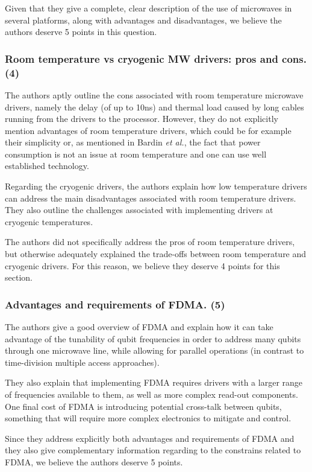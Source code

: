 \documentclass[11pt]{article}
\begin{document}
Given that they give a complete, clear description of the use of
microwaves in several platforms, along with advantages and
disadvantages, we believe the authors deserve 5 points in this
question.

\subsubsection{Room temperature vs cryogenic MW drivers: pros and cons. (4)}
\label{sec:org5e1809f}
The authors aptly outline the cons associated with room
temperature microwave drivers, namely the delay (of up to 10ns)
and thermal load caused by long cables running from the drivers to
the processor. However, they do not explicitly mention advantages
of room temperature drivers, which could be for example their
simplicity or, as mentioned in Bardin \emph{et al.}, the fact that power
consumption is not an issue at room temperature and one can use
well established technology.

Regarding the cryogenic drivers, the authors explain how low
temperature drivers can address the main disadvantages associated
with room temperature drivers. They also outline the challenges
associated with implementing drivers at cryogenic temperatures.

The authors did not specifically address the pros of room
temperature drivers, but otherwise adequately explained the
trade-offs between room temperature and cryogenic drivers. For
this reason, we believe they deserve 4 points for this section.

\subsubsection{Advantages and requirements of FDMA. (5)}
\label{sec:orgb526cf4}
The authors give a good overview of FDMA and explain how it can
take advantage of the tunability of qubit frequencies in order to
address many qubits through one microwave line, while allowing for
parallel operations (in contrast to time-division multiple access
approaches). 

They also explain that implementing FDMA requires drivers with a
larger range of frequencies available to them, as well as more
complex read-out components. One final cost of FDMA is introducing
potential cross-talk between qubits, something that will require
more complex electronics to mitigate and control.

Since they address explicitly both advantages and requirements of FDMA and
they also give complementary information regarding to the constrains related
to FDMA, we believe the authors deserve 5 points.
\end{document}
